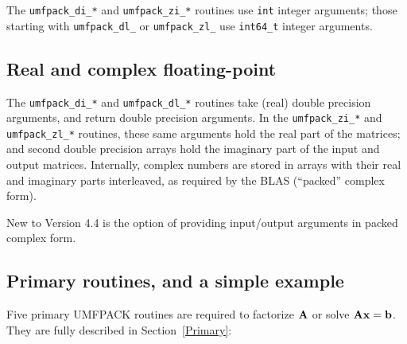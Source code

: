 \documentclass[11pt]{article}
\newcommand{\m}[1]{{\bf{#1}}}       %
\begin{document}
The {\tt umfpack\_di\_*} and {\tt umfpack\_zi\_*} routines use {\tt int} integer
arguments; those starting with {\tt umfpack\_dl\_} or {\tt umfpack\_zl\_}
use \verb'int64_t' integer arguments.

\subsection{Real and complex floating-point}

The {\tt umfpack\_di\_*} and {\tt umfpack\_dl\_*} routines take (real) double
precision arguments, and return double precision arguments.  In the
{\tt umfpack\_zi\_*} and {\tt umfpack\_zl\_*} routines, these same arguments
hold the real part of the matrices; and second double precision arrays hold
the imaginary part of the input and output matrices.  Internally, complex
numbers are stored in arrays with their real and imaginary parts interleaved,
as required by the BLAS (``packed'' complex form).

New to Version 4.4 is the option of providing input/output arguments
in packed complex form.

\subsection{Primary routines, and a simple example}

Five primary UMFPACK routines are required to factorize $\m{A}$ or
solve $\m{Ax}=\m{b}$.  They are fully described in Section~\ref{Primary}:
\end{document}
